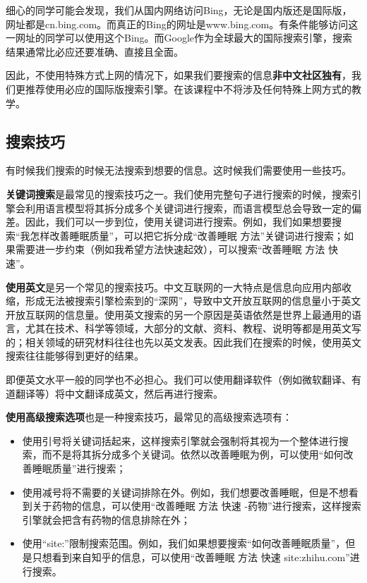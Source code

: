 \documentclass[12pt]{report}
\begin{document}
细心的同学可能会发现，我们从国内网络访问Bing，无论是国内版还是国际版，网址都是cn.bing.com。而真正的Bing的网址是www.bing.com。有条件能够访问这一网址的同学可以使用这个Bing。而Google作为全球最大的国际搜索引擎，搜索结果通常比必应还要准确、直接且全面。

因此，不使用特殊方式上网的情况下，如果我们要搜索的信息\textbf{非中文社区独有}，我们更推荐使用必应的国际版搜索引擎。在该课程中不将涉及任何特殊上网方式的教学。

\subsection{搜索技巧}

有时候我们搜索的时候无法搜索到想要的信息。这时候我们需要使用一些技巧。

\textbf{关键词搜索}是最常见的搜索技巧之一。我们使用完整句子进行搜索的时候，搜索引擎会利用语言模型将其拆分成多个关键词进行搜索，而语言模型总会导致一定的偏差。因此，我们可以一步到位，使用关键词进行搜索。例如，我们如果想要搜索“我怎样改善睡眠质量”，可以把它拆分成“改善睡眠 方法”关键词进行搜索；如果需要进一步约束（例如我希望方法快速起效），可以搜索“改善睡眠 方法 快速”。

\textbf{使用英文}是另一个常见的搜索技巧。中文互联网的一大特点是信息向应用内部收缩，形成无法被搜索引擎检索到的“深网”，导致中文开放互联网的信息量小于英文开放互联网的信息量。使用英文搜索的另一个原因是英语依然是世界上最通用的语言，尤其在技术、科学等领域，大部分的文献、资料、教程、说明等都是用英文写的；相关领域的研究材料往往也先以英文发表。因此我们在搜索的时候，使用英文搜索往往能够得到更好的结果。

即便英文水平一般的同学也不必担心。我们可以使用翻译软件（例如微软翻译、有道翻译等）将中文翻译成英文，然后再进行搜索。

\textbf{使用高级搜索选项}也是一种搜索技巧，最常见的高级搜索选项有：
\begin{itemize}
    \item 使用引号将关键词括起来，这样搜索引擎就会强制将其视为一个整体进行搜索，而不是将其拆分成多个关键词。依然以改善睡眠为例，可以使用“如何改善睡眠质量”进行搜索；
    \item 使用减号将不需要的关键词排除在外。例如，我们想要改善睡眠，但是不想看到关于药物的信息，可以使用“改善睡眠 方法 快速 -药物”进行搜索，这样搜索引擎就会把含有药物的信息排除在外；
    \item 使用“site:”限制搜索范围。例如，我们如果想要搜索“如何改善睡眠质量”，但是只想看到来自知乎的信息，可以使用“改善睡眠 方法 快速 site:zhihu.com”进行搜索。
\end{itemize}
\end{document}
